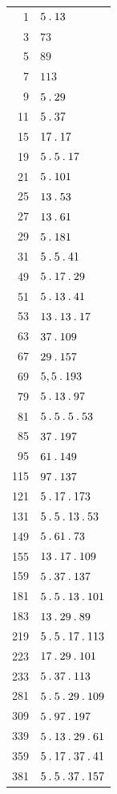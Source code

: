 \begin{longtable}{@{}r|l@{}}
1 & $5\mathbin{.} 13$\\
3 & $73$\\
5 & $89$\\
7 & $113$\\
9 & $5\mathbin{.} 29$\\
11 & $5\mathbin{.} 37$\\
15 & $17\mathbin{.} 17$\\
19 & $5\mathbin{.} 5\mathbin{.} 17$\\
21 & $5\mathbin{.} 101$\\
25 & $13\mathbin{.} 53$\\
27 & $13\mathbin{.} 61$\\
29 & $5\mathbin{.} 181$\\
31 & $5\mathbin{.} 5\mathbin{.} 41$\\
49 & $5\mathbin{.} 17\mathbin{.} 29$\\
51 & $5\mathbin{.} 13\mathbin{.} 41$\\
53 & $13\mathbin{.} 13\mathbin{.} 17$\\
63 & $37\mathbin{.} 109$\\
67 & $29\mathbin{.} 157$\\
69 & $5,5\mathbin{.} 193$\\
79 & $5\mathbin{.} 13\mathbin{.} 97$\\
81 & $5\mathbin{.} 5\mathbin{.} 5\mathbin{.} 53$\\
85 & $37\mathbin{.} 197$\\
95 & $61\mathbin{.} 149$\\
115 & $97\mathbin{.} 137$\\
121 & $5\mathbin{.} 17\mathbin{.} 173$\\
131 & $5\mathbin{.} 5\mathbin{.} 13\mathbin{.} 53$\\
149 & $5\mathbin{.} 61\mathbin{.} 73$\\
155 & $13\mathbin{.} 17\mathbin{.} 109$\\
159 & $5\mathbin{.} 37\mathbin{.} 137$\\
181 & $5\mathbin{.} 5\mathbin{.} 13\mathbin{.} 101$\\
183 & $13\mathbin{.} 29\mathbin{.} 89$\\
219 & $5\mathbin{.} 5\mathbin{.} 17\mathbin{.} 113$\\
223 & $17\mathbin{.} 29\mathbin{.} 101$\\
233 & $5\mathbin{.} 37\mathbin{.} 113$\\
281 & $5\mathbin{.} 5\mathbin{.} 29\mathbin{.} 109$\\
309 & $5\mathbin{.} 97\mathbin{.} 197$\\
339 & $5\mathbin{.} 13\mathbin{.} 29\mathbin{.} 61$\\
359 & $5\mathbin{.} 17\mathbin{.} 37\mathbin{.} 41$\\
381 & $5\mathbin{.} 5\mathbin{.} 37\mathbin{.} 157$\\

\end{longtable}
